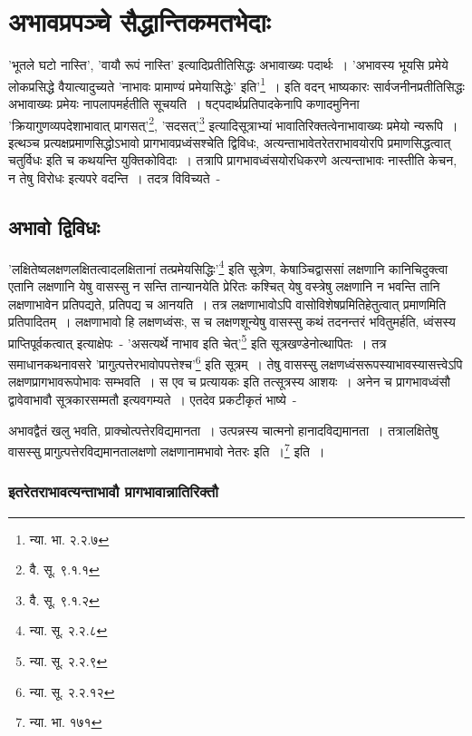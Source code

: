 \chapter{अभावप्रपञ्चे सैद्धान्तिकमतभेदाः}

'भूतले घटो नास्ति', 'वायौ रूपं नास्ति' इत्यादिप्रतीतिसिद्धः‌ अभावाख्यः पदार्थः~। 'अभावस्य भूयसि प्रमेये लोकप्रसिद्धे वैयात्यादुच्यते 'नाभावः प्रामाण्यं प्रमेयासिद्धेः' इति'\footnote{न्या. भा. २.२.७}~। इति वदन् भाष्यकारः सार्वजनीनप्रतीतिसिद्धः अभावाख्यः प्रमेयः नापलापमर्हतीति सूचयति~। षट्पदार्थप्रतिपादकेनापि कणादमुनिना 'क्रियागुणव्यपदेशाभावात् प्रागसत्'\footnote{वै. सू. ९.१.१}, 'सदसत्'\footnote{वै. सू. ९.१.२} इत्यादिसूत्राभ्यां भावातिरिक्तत्वेनाभावाख्यः प्रमेयो न्यरूपि~। इत्थञ्च प्रत्यक्षप्रमाणसिद्धोऽभावो प्रागभावप्रध्वंसश्चेति द्विविधः, अत्यन्ताभावेतरेतराभावयोरपि प्रमाणसिद्धत्वात् चतुर्विधः इति च कथयन्ति युक्तिकोविदाः~। तत्रापि प्रागभावध्वंसयोरधिकरणे अत्यन्ताभावः नास्तीति केचन, न तेषु विरोधः इत्यपरे वदन्ति~। तदत्र विविच्यते~-

	\section{अभावो द्विविधः}

	'लक्षितेष्वलक्षणलक्षितत्वादलक्षितानां तत्प्रमेयसिद्धिः'\footnote{न्या. सू. २.२.८} इति सूत्रेण, केषाञ्चिद्वाससां लक्षणानि कानिचिदुक्त्वा एतानि लक्षणानि येषु वासस्सु न सन्ति तान्यानयेति प्रेरितः कश्चित् येषु वस्त्रेषु लक्षणानि न भवन्ति तानि लक्षणाभावेन प्रतिपद्यते, प्रतिपद्य च आनयति~। तत्र लक्षणाभावोऽपि वासोविशेषप्रमितिहेतुत्वात् प्रमाणमिति प्रतिपादितम्~। लक्षणाभावो हि लक्षणध्वंसः, स च लक्षणशून्येषु वासस्सु कथं तदनन्तरं भवितुमर्हति, ध्वंसस्य प्राप्तिपूर्वकत्वात् इत्याक्षेपः~- 'असत्यर्थे नाभाव इति चेत्'\footnote{न्या. सू. २.२.९} इति सूत्रखण्डेनोत्थापितः~। तत्र समाधानकथनावसरे 'प्रागुत्पत्तेरभावोपपत्तेश्च'\footnote{न्या. सू. २.२.१२} इति सूत्रम्~। तेषु वासस्सु लक्षणध्वंसरूपस्याभावस्यासत्त्वेऽपि लक्षणप्रागभावरूपोभावः सम्भवति~। स एव च प्रत्यायकः इति तत्सूत्रस्य आशयः~। अनेन च प्रागभावध्वंसौ द्वावेवाभावौ सूत्रकारसम्मतौ इत्यवगम्यते~। एतदेव प्रकटीकृतं भाष्ये~-

	{\fontsize{11.7}{0}\selectfont\s अभावद्वैतं खलु भवति, प्राक्चोत्पत्तेरविद्यमानता~। उत्पन्नस्य चात्मनो हानादविद्यमानता~। तत्रालक्षितेषु वासस्सु प्रागुत्पत्तेरविद्यमानतालक्षणो लक्षणानामभावो नेतरः इति~।\footnote{न्या. भा. १७१}} इति~।

		\subsection{इतरेतराभावत्यन्ताभावौ प्रागभावान्नातिरिक्तौ}

